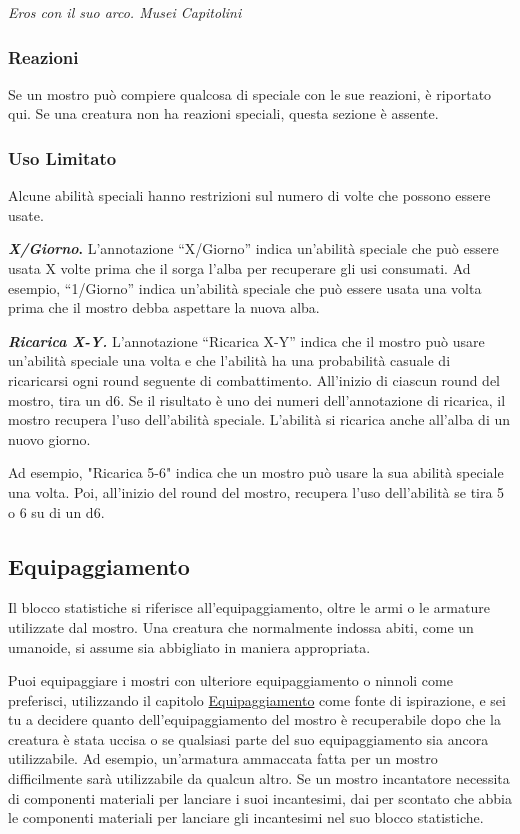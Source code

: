 \begin{multicols}{2}
\textit{Eros con il suo arco. Musei Capitolini}

\subsubsection{Reazioni}

Se un mostro può compiere qualcosa di speciale con le sue reazioni, è riportato qui. Se una creatura non ha reazioni speciali, questa sezione è assente.

\subsubsection{Uso Limitato}

Alcune abilità speciali hanno restrizioni sul numero di volte che possono essere usate.

\textbf{\emph{X/Giorno}.} L'annotazione ``X/Giorno'' indica un'abilità speciale che può essere usata X volte prima che il sorga l'alba per recuperare gli usi consumati. Ad esempio, ``1/Giorno'' indica un'abilità speciale che può essere usata una volta prima che il mostro debba aspettare la nuova alba.

\emph{\textbf{Ricarica X-Y.}} L'annotazione ``Ricarica X-Y'' indica che il mostro può usare un'abilità speciale una volta e che l'abilità ha una probabilità casuale di ricaricarsi ogni round seguente di combattimento. All'inizio di ciascun round del mostro, tira un d6. Se il risultato è uno dei numeri dell'annotazione di ricarica, il mostro recupera l'uso dell'abilità speciale. L'abilità si ricarica anche all'alba di un nuovo giorno.

Ad esempio, "Ricarica 5-6" indica che un mostro può usare la sua abilità speciale una volta. Poi, all'inizio del round del mostro, recupera l'uso dell'abilità se tira 5 o 6 su di un d6.

\subsection{Equipaggiamento}

Il blocco statistiche si riferisce all'equipaggiamento, oltre le armi o le armature utilizzate dal mostro. Una creatura che normalmente indossa abiti, come un umanoide, si assume sia abbigliato in maniera appropriata.

Puoi equipaggiare i mostri con ulteriore equipaggiamento o ninnoli come preferisci, utilizzando il capitolo \hyperlink{equipaggiamento}{Equipaggiamento} come fonte di ispirazione, e sei tu a decidere quanto dell'equipaggiamento del mostro è recuperabile dopo che la creatura è stata uccisa o se qualsiasi parte del suo equipaggiamento sia ancora utilizzabile. Ad esempio, un'armatura ammaccata fatta per un mostro difficilmente sarà utilizzabile da qualcun altro.  Se un mostro incantatore necessita di componenti  materiali per lanciare i suoi incantesimi, dai per  scontato che abbia le componenti materiali per lanciare  gli incantesimi nel suo blocco statistiche.  


\end{multicols}
